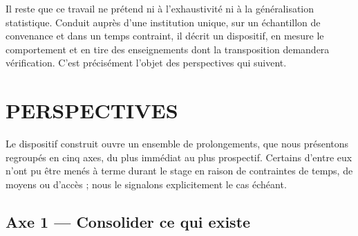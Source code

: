 Il reste que ce travail ne prétend ni à l'exhaustivité ni à la généralisation
statistique. Conduit auprès d'une institution unique, sur un échantillon de
convenance et dans un temps contraint, il décrit un dispositif, en mesure le
comportement et en tire des enseignements dont la transposition demandera
vérification. C'est précisément l'objet des perspectives qui suivent.

\cleardoublepage
{}
\chapter*{PERSPECTIVES}

Le dispositif construit ouvre un ensemble de prolongements, que nous présentons
regroupés en cinq axes, du plus immédiat au plus prospectif. Certains d'entre
eux n'ont pu être menés à terme durant le stage en raison de contraintes de
temps, de moyens ou d'accès ; nous le signalons explicitement le cas échéant.

\section*{Axe 1 — Consolider ce qui existe}

